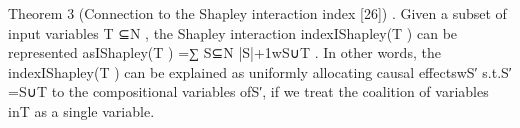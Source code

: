 Theorem 3 (Connection to the Shapley interaction index [26]) . Given a subset of input variables T ⊆N , the Shapley
interaction indexIShapley(T ) can be represented asIShapley(T ) =∑
S⊆N
|S|+1wS∪T . In other words, the indexIShapley(T ) can
be explained as uniformly allocating causal effectswS′ s.t.S′ =S∪T to the compositional variables ofS′, if we treat the
coalition of variables inT as a single variable.
